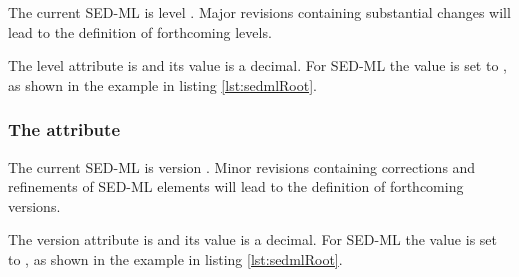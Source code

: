 The current SED-ML  is level \level. Major revisions containing substantial changes will lead to the definition of forthcoming levels.

The level attribute is  and its value is a  decimal. For SED-ML \LoneVone the value is set to , as shown in the example in listing \ref{lst:sedmlRoot}.

\subsubsection{The  attribute}
\label{sec:version}
The current SED-ML  is version \version. Minor revisions containing corrections and refinements of SED-ML elements will lead to the definition of forthcoming versions.

The version attribute is  and its value is a  decimal. For SED-ML \LoneVone the value is set to , as shown in the example in listing \ref{lst:sedmlRoot}.



